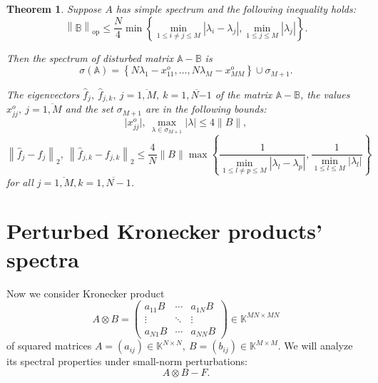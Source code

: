 \documentclass[a4paper]{article}
\newtheorem{thm}{Theorem}
\theoremstyle{definition}
\begin{document}
\begin{thm}
Suppose \( A \) has simple spectrum and the following inequality holds:
\[
    \left\| \mathbb{B} \right\|_{\mathrm{op}}
        \leq 
        \frac{N}{4}
         \min\left\{
             \min\limits_{1\leq i{\neq}j \leq M }{|\lambda_i - \lambda_j|},
             \min\limits_{1\leq j \leq M}{|\lambda_j|}
         \right\}.
 \]

Then the spectrum of disturbed matrix \( \mathbb{A} - \mathbb{B} \) is
\[
    \sigma\left(\mathbb{A}\right) =
        \left\{
            N\lambda_1 - x_{11}^o, \ldots, N\lambda_M - x_{MM}^o
        \right\}
    \cup \sigma_{M{+}1}.
\]

The eigenvectors
    \( \hat{f}_j,\ \hat{f}_{j,k},\ j{=}\overline{1,M},\ k{=}\overline{1,N{-1}} \)
    of the matrix \( \mathbb{A}{-}\mathbb{B} \),
    the values \( x_{jj}^o,\ j{=}\overline{1,M} \)
    and the set \( \sigma_{M{+}1} \) are in the following bounds:
\[
    \lvert x_{jj}^o\rvert,
    \ \max_{\lambda\in\sigma_{M{+}1}} \lvert\lambda\rvert
    \leq 4\|B\|,
\]
\[
    \left\| \hat{f}_j - f_j \right\|_2,
    \ \left\| \hat{f}_{j,k} - f_{j,k}\right\|_2
    \leq
    \frac4N \|B\|
         \max\left\{
         \frac{1}{
             \min\limits_{1\leq l{\neq}p \leq M }{|\lambda_l - \lambda_p|}},
         \frac{1}{
             \min\limits_{1\leq l \leq M}{|\lambda_l|}}
         \right\}
\]
for all \( j{=}\overline{1,M}, k{=}\overline{1,N-1} \).
\end{thm}

\section{Perturbed Kronecker products' spectra}

Now we consider Kronecker product
\[
    A\otimes B =
    \begin{pmatrix}
        a_{11} B & \cdots & a_{1N} B \\
        \vdots   & \ddots & \vdots \\
        a_{N1} B & \cdots & a_{NN} B
    \end{pmatrix}
    \in \mathbb{K}^{{MN}{\times}{MN}}
\]
of squared matrices
\( A={(a_{ij})}\in\mathbb{K}^{N{\times}N},
 \ B={(b_{ij})}\in\mathbb{K}^{M{\times}M}. \)
We will analyze its spectral properties
    under small-norm perturbations:
\begin{equation}\label{-kronperturb}
    A\otimes B - F.
\end{equation}

\end{document}
